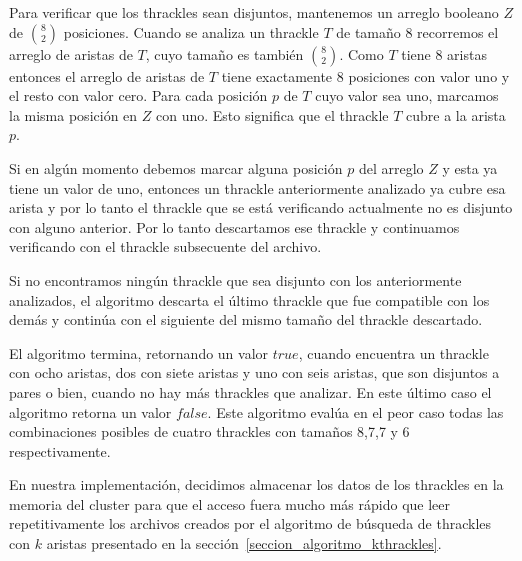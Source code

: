   Para verificar que los thrackles sean disjuntos, mantenemos un arreglo booleano $Z$ de
  $\binom{8}{2}$ posiciones. Cuando se analiza un thrackle $T$ de tamaño 8 recorremos el arreglo de
  aristas de $T$, cuyo tamaño es también $\binom{8}{2}$. Como $T$ tiene 8 aristas entonces el
  arreglo de aristas de $T$ tiene exactamente 8 posiciones con valor uno
  y el resto con valor cero. Para cada posición $p$ de $T$ cuyo valor sea uno, marcamos la misma
  posición en $Z$ con uno. Esto significa que el thrackle $T$ cubre a la arista $p$.

  Si en algún momento debemos marcar alguna posición $p$ del arreglo $Z$ y esta ya tiene un valor
  de uno, entonces un thrackle anteriormente analizado ya cubre esa arista y por lo tanto el
  thrackle que se está verificando actualmente no es disjunto con alguno anterior. Por lo tanto
  descartamos ese thrackle y continuamos verificando con el thrackle subsecuente del archivo.

  Si no encontramos ningún thrackle que sea disjunto con los anteriormente analizados, el
  algoritmo descarta el último thrackle que fue compatible con los demás y continúa con el
  siguiente del mismo tamaño del thrackle descartado.

  El algoritmo termina, retornando un valor $true$, cuando encuentra un thrackle con ocho
  aristas, dos con siete aristas y uno con seis aristas, que son disjuntos a pares o bien, cuando
  no hay más thrackles que analizar. En este último caso el algoritmo retorna un valor $false$. Este algoritmo evalúa en el peor caso todas las combinaciones posibles de cuatro
  thrackles con tamaños 8,7,7 y 6 respectivamente.


  En nuestra implementación, decidimos almacenar los datos de los thrackles en la memoria
  del cluster para que el acceso fuera mucho más rápido que leer repetitivamente los
  archivos creados por el algoritmo de búsqueda de thrackles con $k$ aristas presentado
  en la sección~\ref{seccion_algoritmo_kthrackles}.

